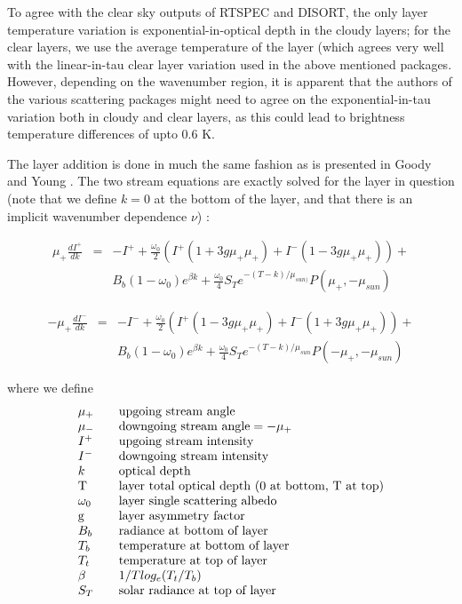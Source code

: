 \documentclass[11pt]{article}
\begin{document}
To agree with the clear sky outputs of \textsf{RTSPEC} and \textsf{DISORT}, 
the only layer temperature variation is exponential-in-optical depth in the 
cloudy layers; 
for the clear layers, we use the average temperature of the layer (which 
agrees very well with the linear-in-tau clear layer variation used in the 
above mentioned packages. However, depending on the wavenumber region, it is
apparent that the authors of the various scattering packages might need to 
agree on the exponential-in-tau variation both in cloudy and clear layers, as 
this could lead to brightness temperature differences of upto 0.6 K.

The layer addition is done in much the same fashion as is presented in Goody 
and Young \cite{goo:89}. The two stream equations are exactly solved for 
the layer in question (note that we define $k=0$ at the bottom of the 
layer, and that there is an implicit wavenumber dependence $\nu$) : 

\[
\begin{array}{ccc}
\mu_{+} \frac{dI^{+}}{dk} & = & -I^{+} + \frac{\omega_{0}}{2} 
(I^{+}(1 + 3g\mu_{+} \mu_{+}) + I^{-}(1 - 3g\mu_{+} \mu_{+})) + \\
                             & & B_{b}(1-\omega_{0})e^{\beta k} + 
\frac{\omega_{0}}{4}S_{T}e^{-(T-k)/\mu_{sun)}}P(\mu_{+},-\mu_{sun})
\end{array}
\]

\[
\begin{array}{ccc}
-\mu_{+} \frac{dI^{-}}{dk} & = & -I^{-} + \frac{\omega_{0}}{2} 
(I^{+}(1 - 3g\mu_{+} \mu_{+}) + I^{-}(1 + 3g\mu_{+} \mu_{+})) + \\
                            & & B_{b}(1-\omega_{0})e^{\beta k} + 
\frac{\omega_{0}}{4} S_{T} e^{-(T-k)/\mu_{sun}}P(-\mu_{+},-\mu_{sun})
\end{array}
\]

where we define
\[
\begin{array}{lcl}
\mu_{+}            & & \mbox{upgoing stream angle} \\
\mu_{-}            & & \mbox{downgoing stream angle} = -\mu_{+} \\
I^{+}              & & \mbox{upgoing stream intensity} \\
I^{-}              & & \mbox{downgoing stream intensity} \\
k               & & \mbox{optical depth} \\
$T$           & & \mbox{layer total optical depth (0 at bottom, T at top)} \\
\omega_{0}         & & \mbox{layer single scattering albedo} \\
$g$         & & \mbox{layer asymmetry factor} \\
B_{b}        & & \mbox{radiance at bottom of layer} \\
T_{b}        & & \mbox{temperature at bottom of layer} \\
T_{t}        & & \mbox{temperature at top of layer} \\
\beta        & & 1/T log_{e}(T_{t}/T_{b}) \\
S_{T}        & & \mbox{solar radiance at top of layer} 
\end{array}
\]
\end{document}
